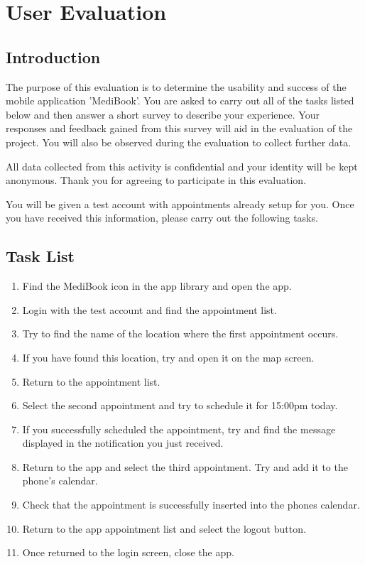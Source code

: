 
\chapter{User Evaluation} %

\label{AppendixE} %


\section{Introduction}

The purpose of this evaluation is to determine the usability and success of the mobile application 'MediBook'. You are asked to carry out all of the tasks listed below and then answer a short survey to describe your experience. Your responses and feedback gained from this survey will aid in the evaluation of the project. You will also be observed during the evaluation to collect further data.

All data collected from this activity is confidential and your identity will be kept anonymous. Thank you for agreeing to participate in this evaluation.

You will be given a test account with appointments already setup for you. Once you have received this information, please carry out the following tasks.

\section{Task List}

\begin{enumerate}
	\item Find the MediBook icon in the app library and open the app.
	\item Login with the test account and find the appointment list.
	\item Try to find the name of the location where the first appointment occurs.
	\item If you have found this location, try and open it on the map screen.
	\item Return to the appointment list.
	\item Select the second appointment and try to schedule it for 15:00pm today.
	\item If you successfully scheduled the appointment, try and find the message displayed in the notification you just received.
	\item Return to the app and select the third appointment. Try and add it to the phone's calendar.
	\item Check that the appointment is successfully inserted into the phones calendar.
	\item Return to the app appointment list and select the logout button.
	\item Once returned to the login screen, close the app.
\end{enumerate}